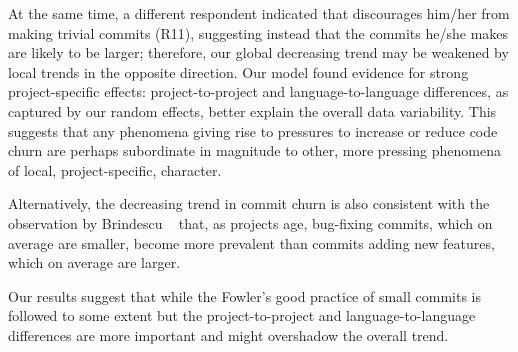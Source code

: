 At the same time, a different respondent indicated that \Tvis discourages 
him/her from making trivial commits (R11), suggesting instead that the 
commits he/she makes are likely to be larger;
therefore, our global decreasing trend may be weakened by local trends
in the opposite direction.
Our model found evidence for strong project-specific effects: 
project-to-project and language-to-language differences, as captured by 
our random effects, better explain the overall data variability. 
This suggests that any phenomena giving rise to pressures to increase 
or reduce code churn are perhaps subordinate in magnitude to other, 
more pressing phenomena of local, \ie project-specific, character.

Alternatively, the decreasing trend in commit churn is also consistent with 
the observation by Brindescu \etal~\cite{brindescu2014centralized} that, 
as projects age, bug-fixing commits, which on average are smaller, 
become more prevalent than commits adding new features, which on 
average are larger.

Our results suggest that while the Fowler's good practice of small commits is followed to some extent but the project-to-project and language-to-language differences are more important and might overshadow the overall trend.




